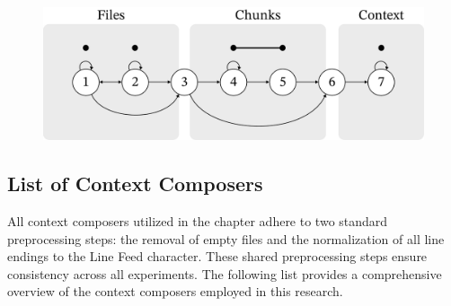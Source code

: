 \begin{figure}[ht]
    \centering
    \includegraphics[width=\textwidth]{figures/composer-blocks.pdf}
    \label{fig:composer-blocks}
\end{figure}

\subsection{List of Context Composers}\label{sec:context-composers-list}

\begin{sloppypar}
All context composers utilized in the  chapter adhere to two standard preprocessing steps: the removal of empty files and the normalization of all line endings to the Line Feed character. These shared preprocessing steps ensure consistency across all experiments. The following list provides a comprehensive overview of the context composers employed in this research.
\end{sloppypar}

